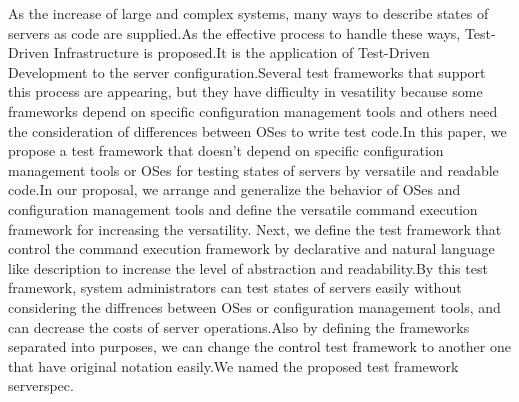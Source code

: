 \begin{eabstract}
As the increase of large and complex systems, many ways to describe states of servers as code are supplied.As the effective process to handle these ways, Test-Driven Infrastructure is proposed.It is the application of Test-Driven Development to the server configuration.Several test frameworks that support this process are appearing, but they have difficulty in vesatility because some frameworks depend on specific configuration management tools and others need the consideration of differences between OSes to write test code.In this paper, we propose a test framework that doesn't depend on specific configuration management tools or OSes for testing states of servers by versatile and readable code.In our proposal, we arrange and generalize the behavior of OSes and configuration management tools and define the versatile command execution framework for increasing the versatility. Next, we define the test framework that control the command execution framework by declarative and natural language like description to increase the level of abstraction and readability.By this test framework, system administrators can test states of servers easily without considering the diffrences between OSes or configuration management tools, and can decrease the costs of server operations.Also by defining the frameworks separated into purposes, we can change the control test framework to another one that have original notation easily.We named the proposed test framework serverspec.
\end{eabstract}
